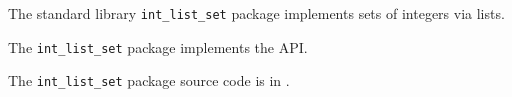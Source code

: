 
The standard library {\tt int\_list\_set} package implements sets 
of integers via lists.

The {\tt int\_list\_set} package implements the  API.

The {\tt int\_list\_set} package source code is in .




